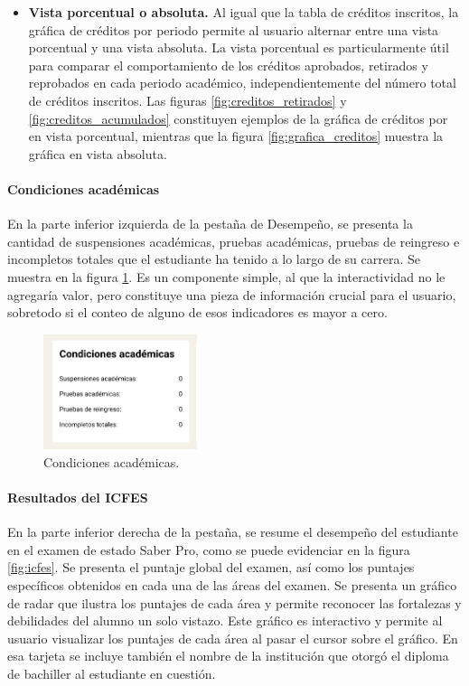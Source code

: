 \begin{itemize}
	\item \textbf{Vista porcentual o absoluta.} Al igual que la tabla de créditos inscritos, la gráfica de créditos por periodo permite al usuario alternar entre una vista porcentual y una vista absoluta. La vista porcentual es particularmente útil para comparar el comportamiento de los créditos aprobados, retirados y reprobados en cada periodo académico, independientemente del número total de créditos inscritos. Las figuras \ref{fig:creditos_retirados} y \ref{fig:creditos_acumulados} constituyen ejemplos de la gráfica de créditos por en vista porcentual, mientras que la figura \ref{fig:grafica_creditos} muestra la gráfica en vista absoluta.
\end{itemize}

\paragraph{Condiciones académicas} En la parte inferior izquierda de la pestaña de Desempeño, se presenta la cantidad de suspensiones académicas, pruebas académicas, pruebas de reingreso e incompletos totales que el estudiante ha tenido a lo largo de su carrera. Se muestra en la figura \ref{fig:condiciones_academicas}. Es un componente simple, al que la interactividad no le agregaría valor, pero constituye una pieza de información crucial para el usuario, sobretodo si el conteo de alguno de esos indicadores es mayor a cero.

\begin{figure}[H]
	\centering
	\includegraphics[width=0.4\textwidth]{assets/nes/condiciones_academicas.png}
	\caption{Condiciones académicas.}
	\label{fig:condiciones_academicas}
\end{figure}

\paragraph{Resultados del ICFES} En la parte inferior derecha de la pestaña, se resume el desempeño del estudiante en el examen de estado Saber Pro, como se puede evidenciar en la figura \ref{fig:icfes}. Se presenta el puntaje global del examen, así como los puntajes específicos obtenidos en cada una de las áreas del examen. Se presenta un gráfico de radar que ilustra los puntajes de cada área y permite reconocer las fortalezas y debilidades del alumno un solo vistazo. Este gráfico es interactivo y permite al usuario visualizar los puntajes de cada área al pasar el cursor sobre el gráfico. En esa tarjeta se incluye también el nombre de la institución que otorgó el diploma de bachiller al estudiante en cuestión.

